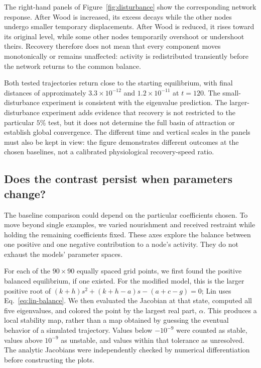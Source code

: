 \documentclass{article}
\begin{document}
The right-hand panels of Figure~\ref{fig:disturbance} show the corresponding
network response. After Wood is increased, its excess decays while the
other nodes undergo smaller temporary displacements. After Wood is reduced,
it rises toward its original level, while some other nodes temporarily
overshoot or undershoot theirs. Recovery therefore does not mean that
every component moves monotonically or remains unaffected: activity is
redistributed transiently before the network returns to the common balance.

Both tested trajectories return close to the starting equilibrium, with
final distances of approximately $3.3\times10^{-12}$ and
$1.2\times10^{-11}$ at $t=120$. The small-disturbance experiment is
consistent with the eigenvalue prediction. The larger-disturbance experiment
adds evidence that recovery is not restricted to the particular $5\%$
test, but it does not determine the full basin of attraction or establish
global convergence. The different time and vertical scales in the panels
must also be kept in view: the figure demonstrates different outcomes at
the chosen baselines, not a calibrated physiological recovery-speed ratio.

\subsection{Does the contrast persist when parameters change?}
The baseline comparison could depend on the particular coefficients chosen.
To move beyond single examples, we varied nourishment and received restraint
while holding the remaining coefficients fixed. These axes explore the
balance between one positive and one negative contribution to a node's
activity. They do not exhaust the models' parameter spaces.

For each of the $90\times90$ equally spaced grid points, we first found
the positive balanced equilibrium, if one existed. For the modified model,
this is the larger positive root of
$(k+h)s^2+(k+h-a)s-(a+c-g)=0$; Lin uses
Eq.~\eqref{eq:lin-balance}. We then evaluated the Jacobian at that state,
computed all five eigenvalues, and colored the point by the largest real
part, $\alpha$. This produces a local stability map, rather than a map
obtained by guessing the eventual behavior of a simulated trajectory.
Values below $-10^{-9}$ were counted as stable, values above $10^{-9}$ as
unstable, and values within that tolerance as unresolved. The analytic
Jacobians were independently checked by numerical differentiation before
constructing the plots.
\end{document}
